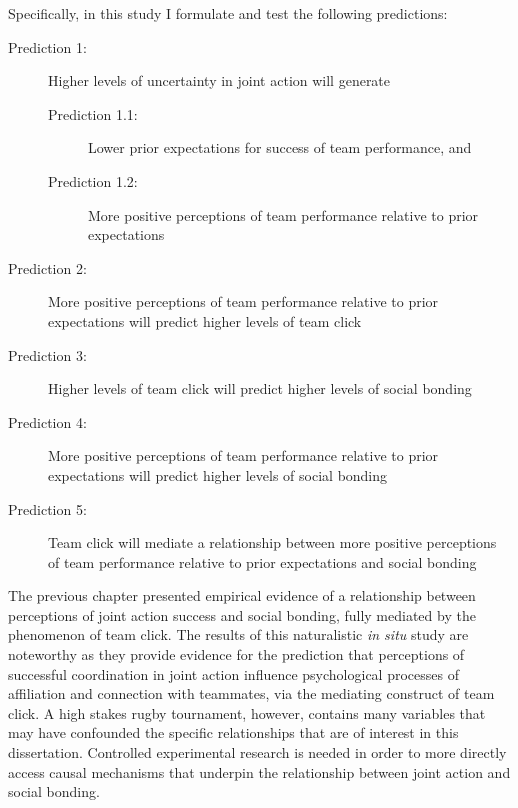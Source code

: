 Specifically, in this study I formulate and test the following predictions:

\begin{description}
\item[Prediction 1:] Higher levels of uncertainty in joint action will generate
    \begin{description}
      \item [Prediction 1.1:] Lower prior expectations for success of team performance, and
      \item [Prediction 1.2:] More positive perceptions of team performance relative to prior expectations
    \end{description}
\item[Prediction 2:] More positive perceptions of team performance relative to prior expectations will predict higher levels of team click
\item[Prediction 3:] Higher levels of team click will predict higher levels of social bonding
\item[Prediction 4:] More positive perceptions of team performance relative to prior expectations will predict higher levels of social bonding
\item[Prediction 5:] Team click will mediate a relationship between more positive perceptions of team performance relative to prior expectations and social bonding
\end{description}



The previous chapter presented empirical evidence of a relationship between perceptions of joint action success and social bonding, fully mediated by the phenomenon of team click.  The results of this naturalistic \textit{in situ} study are noteworthy as they provide evidence for the prediction that perceptions of successful coordination in joint action influence psychological processes of affiliation and connection with teammates, via the mediating construct of team click.  A high stakes rugby tournament, however, contains many variables that may have confounded the specific relationships that are of interest in this dissertation.   Controlled experimental research is needed in order to more directly access causal mechanisms that underpin the relationship between joint action and social bonding.

